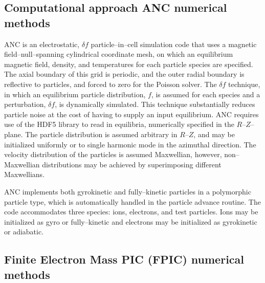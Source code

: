 \documentclass[a4paper,openany,12pt]{book}
\begin{document}
\subsection*{Computational approach ANC numerical methods}

ANC is an electrostatic, $\delta f$ particle--in--cell simulation code that uses a magnetic field--null--spanning cylindrical coordinate mesh, on which an equilibrium magnetic field, density, and temperatures for each particle species are specified. The axial boundary of this grid is periodic, and the outer radial boundary is reflective to particles, and forced to zero for the Poisson solver. The $\delta f$ technique, in which an equilibrium particle distribution, $f$, is assumed for each species and a perturbation, $\delta f$, is dynamically simulated. This technique substantially reduces particle noise at the cost of having to supply an input equilibrium. ANC requires use of the HDF5 library to read in equilibria, numerically specified in the $R$--$Z$--plane. The particle distribution is assumed arbitrary in $R$--$Z$, and may be initialized uniformly or to single harmonic mode in the azimuthal direction. The velocity distribution of the particles is assumed Maxwellian, however, non--Maxwellian distributions may be achieved by superimposing different Maxwellians.

ANC implements both gyrokinetic and fully--kinetic particles in a polymorphic particle type, which is automatically handled in the particle advance routine. The code accommodates three species: ions, electrons, and test particles. Ions may be initialized as gyro or fully--kinetic and electrons may be initialized as gyrokinetic or adiabatic.

\subsection*{Finite Electron Mass PIC (FPIC)  numerical methods}
\end{document}
